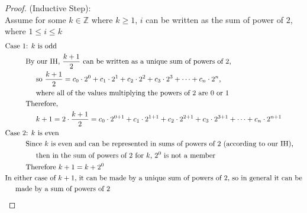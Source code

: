 \documentclass{article}
\begin{document}
\begin{enumerate}
\begin{proof}
        (Inductive Step): \\
        Assume for some $k \in \mathbb{Z}$ where $k \geq 1$, $i$ can be written as the sum of power of $2$, where $1 \leq i \leq k$ \\
        \begin{align}
            &\text{Case 1: } k \text{ is odd} \\
            &\hspace{1cm} \text{By our IH, } \frac{k+1}{2} \text{ can be written as a unique sum of powers of $2$,} \\
            &\hspace{1.5cm} \text{so } \frac{k+1}{2} = c_0 \cdot 2^0 + c_1 \cdot 2^1 + c_2 \cdot 2^2 + c_3 \cdot 2^3 + \dots + c_n \cdot 2^n \text{,} \nonumber \\
            &\hspace{1.5cm} \text{where all of the values multiplying the powers of $2$ are $0$ or $1$} \nonumber \\
            &\hspace{1cm} \text{Therefore, } \\
            &\hspace{1.5cm} k+1 = 2 \cdot \frac{k+1}{2} = c_0 \cdot 2^{0+1} + c_1 \cdot 2^{1+1} + c_2 \cdot 2^{2+1} + c_3 \cdot 2^{3+1} + \dots + c_n \cdot 2^{n+1} \nonumber \\
            &\text{Case 2: } k \text{ is even} \\
            &\hspace{1cm} \text{Since } k \text{ is even and can be represented in sums of powers of $2$ (according to our IH),} \\
            &\hspace{1.5cm} \text{then in the sum of powers of } 2 \text{ for } k \text{, } 2^0 \text{ is not a member} \nonumber \\
            &\hspace{1cm} \text{Therefore } k+1 = k + 2^0 \\
            &\text{In either case of } k+1 \text{, it can be made by a unique sum of powers of $2$, so in general it can be} \\
            &\hspace{.5cm} \text{made by a sum of powers of $2$} \nonumber
        \end{align}
    \end{proof}
\end{enumerate}
\end{document}

